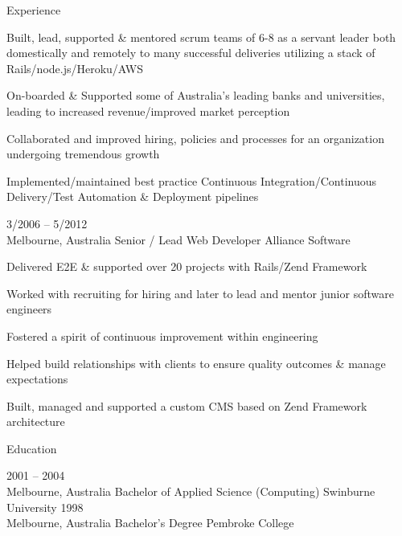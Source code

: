 \documentclass[9pt]{developercv} %
\begin{document}
\begin{cvsect}{Experience}
\begin{entrylist}
      {Built, lead, supported \& mentored scrum teams of 6-8 as a servant leader both domestically and remotely to many successful deliveries utilizing a stack of  Rails/node.js/Heroku/AWS
      \par\medskip On-boarded \& Supported some of Australia's leading banks and universities, leading to increased revenue/improved market perception
      \par\medskip Collaborated and improved hiring, policies and processes for an organization undergoing tremendous growth
      \par\medskip Implemented/maintained best practice Continuous
      Integration/Continuous Delivery/Test Automation \& Deployment pipelines}
    \entry
      {3/2006 -- 5/2012\\\footnotesize{Melbourne, Australia}}
      {Senior / Lead Web Developer}
      {Alliance Software}
      {Delivered E2E \& supported over 20 projects with Rails/Zend Framework
      \par\medskip Worked with recruiting for hiring and later to lead and mentor junior software engineers
      \par\medskip Fostered a spirit of continuous improvement within engineering
      \par\medskip Helped build relationships with clients to ensure quality outcomes \& manage expectations
      \par\medskip Built, managed and supported a custom CMS based on Zend
      Framework architecture}
  \end{entrylist}
\end{cvsect}


\begin{cvsect}{Education}

  \begin{entrylist}
    \entry
      {2001 -- 2004\\\footnotesize{Melbourne, Australia}}
      {Bachelor of Applied Science (Computing)}
      {Swinburne University}
      {}
    \entry
      {1998\\\footnotesize{Melbourne, Australia}}
      {Bachelor's Degree}
      {Pembroke College}
      {}
  \end{entrylist}
\end{cvsect}
\end{document}
